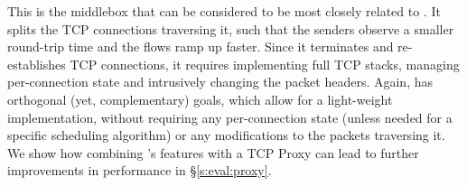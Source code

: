  This is the middlebox that can be considered to be most closely related to \name. It splits the TCP connections traversing it, such that the senders observe a smaller round-trip time and the flows ramp up faster. Since it terminates and re-establishes TCP connections, it requires implementing full TCP stacks, managing per-connection state and intrusively changing the packet headers. Again, \name has orthogonal (yet, complementary) goals, which allow for a light-weight implementation, without requiring any per-connection state (unless needed for a specific scheduling algorithm) or any modifications to the packets traversing it. We show how combining \name's features with a TCP Proxy can lead to further improvements in performance in \S\ref{s:eval:proxy}. 


